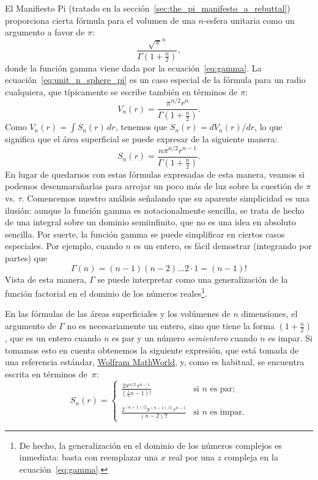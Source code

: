 El Manifiesto Pi (tratado en la sección~\ref{sec:the_pi_manifesto_a_rebuttal}) proporciona cierta fórmula para el volumen de una $n$-esfera unitaria como un argumento a favor de $\pi$:
\begin{equation}
\label{eq:unit_n_sphere_pi}
\frac{\sqrt{\pi}^{n} }{\Gamma(1 + \frac{n}{2})},
\end{equation}
donde la función gamma viene dada por la ecuación~\eqref{eq:gamma}. La ecuación~\eqref{eq:unit_n_sphere_pi} es un caso especial de la fórmula para un radio cualquiera, que típicamente se escribe también en términos de $\pi$:
\begin{equation}
\label{eq:n_sphere_pi}
V_n(r) = \frac{\pi^{n/2} r^n}{\Gamma(1 + \frac{n}{2})}.
\end{equation}
Como $V_n(r) = \int S_n(r)\,dr$, tenemos que $S_n(r) = dV_n(r)/dr$, lo que significa que el área superficial se puede expresar de la siguiente manera:
\begin{equation}
\label{eq:n_sphere_pi_r}
S_n(r) = \frac{n \pi^{n/2} r^{n-1}}{\Gamma(1 + \frac{n}{2})}.
\end{equation}
En lugar de quedarnos con estas fórmulas expresadas de esta manera, veamos si podemos desenmarañarlas para arrojar un poco más de luz sobre la cuestión de $\pi$ vs. $\tau$. Comencemos nuestro análisis señalando que su aparente simplicidad es una ilusión: aunque la función gamma es notacionalmente sencilla, se trata de hecho de una integral sobre un dominio semiinfinito, que no es una idea en absoluto sencilla. Por suerte, la función gamma se puede simplificar en ciertos casos especiales. Por ejemplo, cuando $n$ es un entero, es fácil demostrar (integrando por partes) que
\[
\Gamma(n) = (n-1)(n-2)\ldots 2\cdot 1 = (n-1)!
\]
Vista de esta manera, $\Gamma$ se puede interpretar como una generalización de la función factorial en el dominio de los números reales\footnote{De hecho, la generalización en el dominio de los números complejos es inmediata: basta con reemplazar una $x$ real por una  $z$ compleja en la ecuación~\eqref{eq:gamma}.}.

En las fórmulas de las áreas superficiales y los volúmenes de $n$ dimensiones, el argumento de $\Gamma$ no es necesariamente un entero, sino que tiene la forma $\left(1 + \frac{n}{2}\right)$, que es un entero cuando $n$ es par y un número \emph{semientero} cuando $n$ es impar. Si tomamos esto en cuenta obtenemos la siguiente expresión, que está tomada de una referencia estándar, \href{http://mathworld.wolfram.com/Hypersphere.html}{Wolfram MathWorld}, y, como es habitual, se encuentra escrita en términos de~$\pi$:
\begin{equation}
\label{eq:surface_area_mathworld}
S_n(r) = \begin{cases}
\displaystyle \frac{2\pi^{n/2}\,r^{n-1}}{(\frac{1}{2}n - 1)!} & \text{si } n \text{ es par}; \\ \\
 \displaystyle \frac{2^{(n+1)/2}\pi^{(n-1)/2}\,r^{n-1}}{(n-2)!!} & \text{si } n \text{ es impar}.
\end{cases}
\end{equation}

